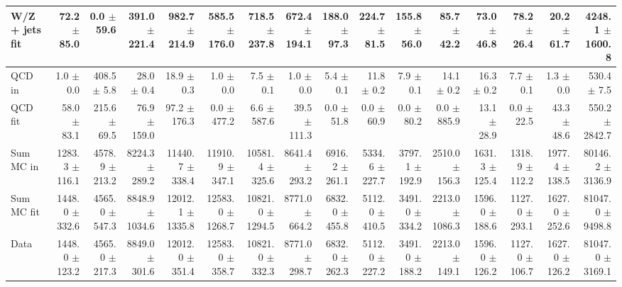 \begin{table}[htbp]
{\begin{tabular}{lrrrrrrrrrrrrrrr}
W/Z + jets fit & 72.2 $\pm$ 85.0 & 0.0 $\pm$ 59.6 & 391.0 $\pm$ 221.4 & 982.7 $\pm$ 214.9 & 585.5 $\pm$ 176.0 & 718.5 $\pm$ 237.8 & 672.4 $\pm$ 194.1 & 188.0 $\pm$ 97.3 & 224.7 $\pm$ 81.5 & 155.8 $\pm$ 56.0 & 85.7 $\pm$ 42.2 & 73.0 $\pm$ 46.8 & 78.2 $\pm$ 26.4 & 20.2 $\pm$ 61.7 & 4248.1 $\pm$ 1600.8 \\
\hline
QCD in & 1.0 $\pm$ 0.0 & 408.5 $\pm$ 5.8 & 28.0 $\pm$ 0.4 & 18.9 $\pm$ 0.3 & 1.0 $\pm$ 0.0 & 7.5 $\pm$ 0.1 & 1.0 $\pm$ 0.0 & 5.4 $\pm$ 0.1 & 11.8 $\pm$ 0.2 & 7.9 $\pm$ 0.1 & 14.1 $\pm$ 0.2 & 16.3 $\pm$ 0.2 & 7.7 $\pm$ 0.1 & 1.3 $\pm$ 0.0 & 530.4 $\pm$ 7.5 \\
QCD fit & 58.0 $\pm$ 83.1 & 215.6 $\pm$ 69.5 & 76.9 $\pm$ 159.0 & 97.2 $\pm$ 176.3 & 0.0 $\pm$ 477.2 & 6.6 $\pm$ 587.6 & 39.5 $\pm$ 111.3 & 0.0 $\pm$ 51.8 & 0.0 $\pm$ 60.9 & 0.0 $\pm$ 80.2 & 0.0 $\pm$ 885.9 & 13.1 $\pm$ 28.9 & 0.0 $\pm$ 22.5 & 43.3 $\pm$ 48.6 & 550.2 $\pm$ 2842.7 \\
\hline
Sum MC in & 1283.3 $\pm$ 116.1 & 4578.9 $\pm$ 213.2 & 8224.3 $\pm$ 289.2 & 11440.7 $\pm$ 338.4 & 11910.9 $\pm$ 347.1 & 10581.4 $\pm$ 325.6 & 8641.4 $\pm$ 293.2 & 6916.2 $\pm$ 261.1 & 5334.6 $\pm$ 227.7 & 3797.1 $\pm$ 192.9 & 2510.0 $\pm$ 156.3 & 1631.3 $\pm$ 125.4 & 1318.9 $\pm$ 112.2 & 1977.4 $\pm$ 138.5& 80146.2 $\pm$ 3136.9 \\
Sum MC fit & 1448.0 $\pm$ 332.6 & 4565.0 $\pm$ 547.3 & 8848.9 $\pm$ 1034.6 & 12012.1 $\pm$ 1335.8 & 12583.0 $\pm$ 1268.7 & 10821.0 $\pm$ 1294.5 & 8771.0 $\pm$ 664.2 & 6832.0 $\pm$ 455.8 & 5112.0 $\pm$ 410.5 & 3491.0 $\pm$ 334.2 & 2213.0 $\pm$ 1086.3 & 1596.0 $\pm$ 188.6 & 1127.0 $\pm$ 293.1 & 1627.0 $\pm$ 252.6 & 81047.0 $\pm$ 9498.8 \\
\hline
Data & 1448.0 $\pm$ 123.2 & 4565.0 $\pm$ 217.3 & 8849.0 $\pm$ 301.6 & 12012.0 $\pm$ 351.4 & 12583.0 $\pm$ 358.7 & 10821.0 $\pm$ 332.3 & 8771.0 $\pm$ 298.7 & 6832.0 $\pm$ 262.3 & 5112.0 $\pm$ 227.2 & 3491.0 $\pm$ 188.2 & 2213.0 $\pm$ 149.1 & 1596.0 $\pm$ 126.2 & 1127.0 $\pm$ 106.7 & 1627.0 $\pm$ 126.2 & 81047.0 $\pm$ 3169.1 \\
\hline
\end{tabular}
}
\end{table}
